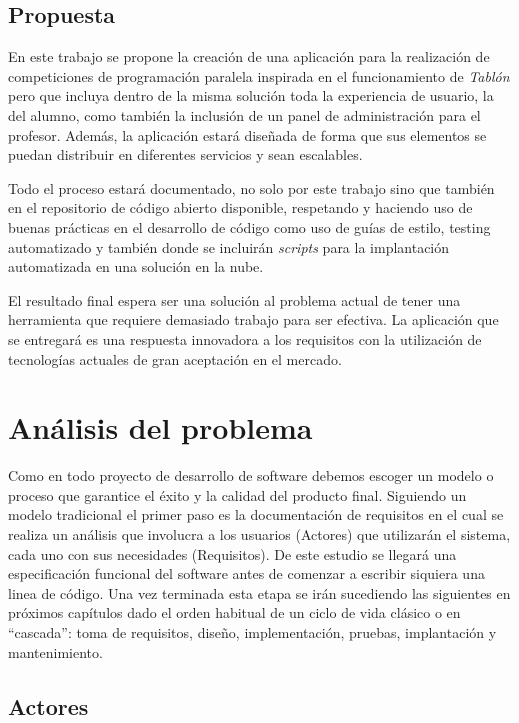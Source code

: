 \documentclass[11pt,spanish,listoffigures,listoftables]{tfgetsinf}
\begin{document}
\section{Propuesta}

En este trabajo se propone la creación de una aplicación para la realización de competiciones de programación paralela inspirada en el funcionamiento de \textit{Tablón} pero que incluya dentro de la misma solución toda la experiencia de usuario, la del alumno, como también la inclusión de un panel de administración para el profesor. Además, la aplicación estará diseñada de forma que sus elementos se puedan distribuir en diferentes servicios y sean escalables. 

Todo el proceso estará documentado, no solo por este trabajo sino que también en el repositorio de código abierto disponible, respetando y haciendo uso de buenas prácticas en el desarrollo de código como uso de guías de estilo, testing automatizado y también donde se incluirán \textit{scripts} para la implantación automatizada en una solución en la nube.

El resultado final espera ser una solución al problema actual de tener una herramienta que requiere demasiado trabajo para ser efectiva. La aplicación que se entregará es una respuesta innovadora a los requisitos con la utilización de tecnologías actuales de gran aceptación en el mercado.

\chapter{Análisis del problema}

Como en todo proyecto de desarrollo de software debemos escoger un modelo o proceso que garantice el éxito y la calidad del producto final. Siguiendo un modelo tradicional el primer paso es la documentación de requisitos \cite{libingreq} en el cual se realiza un análisis que involucra a los usuarios (Actores) que utilizarán el sistema, cada uno con sus necesidades (Requisitos). De este estudio se llegará una especificación funcional del software antes de comenzar a escribir siquiera una linea de código. Una vez terminada esta etapa se irán sucediendo las siguientes en próximos capítulos dado el orden habitual de un ciclo de vida clásico \cite{libingsoft} o en ``cascada'': toma de requisitos, diseño, implementación, pruebas, implantación y mantenimiento.

\section{Actores}
\end{document}
